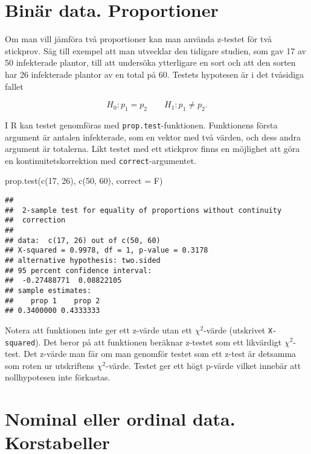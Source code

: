 \documentclass[
]{book}
\newenvironment{Shaded}{\begin{snugshade}}{\end{snugshade}}
\newcommand{\AttributeTok}[1]{\textcolor[rgb]{0.77,0.63,0.00}{#1}}
\newcommand{\DecValTok}[1]{\textcolor[rgb]{0.00,0.00,0.81}{#1}}
\newcommand{\FunctionTok}[1]{\textcolor[rgb]{0.00,0.00,0.00}{#1}}
\newcommand{\NormalTok}[1]{#1}
\theoremstyle{definition}
\theoremstyle{definition}
\theoremstyle{definition}
\theoremstyle{definition}
\theoremstyle{remark}
\begin{document}
\hypertarget{binuxe4r-data.-proportioner-1}{%
\section{Binär data. Proportioner}\label{binuxe4r-data.-proportioner-1}}

Om man vill jämföra två proportioner kan man använda z-testet för två stickprov. Säg till exempel att man utvecklar den tidigare studien, som gav 17 av 50 infekterade plantor, till att undersöka ytterligare en sort och att den sorten har 26 infekterade plantor av en total på 60. Testets hypotesen är i det tvåsidiga fallet

\[H_0: p_1 = p_2 \qquad H_1: p_1 \neq p_2.\]

I R kan testet genomföras med \texttt{prop.test}-funktionen. Funktionens första argument är antalen infekterade, som en vektor med två värden, och dess andra argument är totalerna. Likt testet med ett stickprov finns en möjlighet att göra en kontinuitetskorrektion med \texttt{correct}-argumentet.

\begin{Shaded}
\begin{Highlighting}[]
\FunctionTok{prop.test}\NormalTok{(}\FunctionTok{c}\NormalTok{(}\DecValTok{17}\NormalTok{, }\DecValTok{26}\NormalTok{), }\FunctionTok{c}\NormalTok{(}\DecValTok{50}\NormalTok{, }\DecValTok{60}\NormalTok{), }\AttributeTok{correct =}\NormalTok{ F)}
\end{Highlighting}
\end{Shaded}

\begin{verbatim}
## 
##  2-sample test for equality of proportions without continuity
##  correction
## 
## data:  c(17, 26) out of c(50, 60)
## X-squared = 0.9978, df = 1, p-value = 0.3178
## alternative hypothesis: two.sided
## 95 percent confidence interval:
##  -0.27488771  0.08822105
## sample estimates:
##    prop 1    prop 2 
## 0.3400000 0.4333333
\end{verbatim}

Notera att funktionen inte ger ett z-värde utan ett \(\chi^2\)-värde (utskrivet \texttt{X-squared}). Det beror på att funktionen beräknar z-testet som ett likvärdigt \(\chi^2\)-test. Det z-värde man får om man genomför testet som ett z-test är detsamma som roten ur utskriftens \(\chi^2\)-värde.
Testet ger ett högt p-värde vilket innebär att nollhypotesen inte förkastas.

\hypertarget{nominal-eller-ordinal-data.-korstabeller}{%
\section{Nominal eller ordinal data. Korstabeller}\label{nominal-eller-ordinal-data.-korstabeller}}
\end{document}
